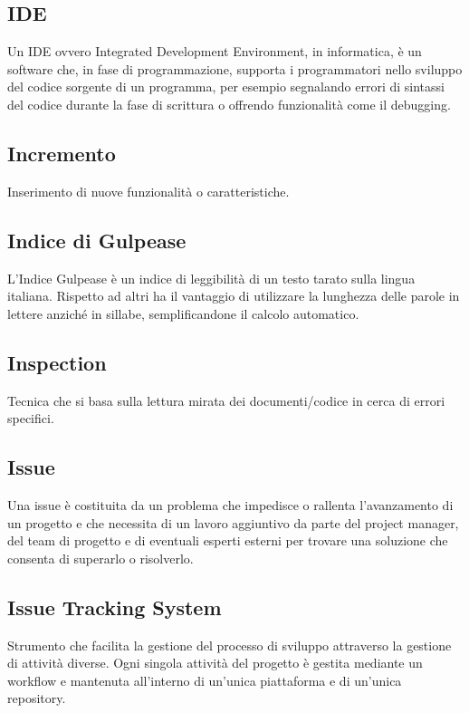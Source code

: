 

\subsection*{IDE}
Un IDE ovvero Integrated Development Environment, in informatica, è un software che, in fase di programmazione, supporta i programmatori nello sviluppo del codice sorgente di un programma, per esempio segnalando errori di sintassi del codice durante la fase di scrittura o offrendo funzionalità come il debugging.

\subsection*{Incremento}
Inserimento di nuove funzionalità o caratteristiche.

\subsection*{Indice di Gulpease}
L'Indice Gulpease è un indice di leggibilità di un testo tarato sulla lingua italiana. Rispetto ad altri ha il vantaggio di utilizzare la lunghezza delle parole in lettere anziché in sillabe, semplificandone il calcolo automatico.

\subsection*{Inspection}
Tecnica che si basa sulla lettura mirata dei documenti/codice in cerca di errori specifici.

\subsection*{Issue}
Una issue è costituita da un problema che impedisce o rallenta l’avanzamento di un progetto e che necessita di un lavoro aggiuntivo da parte del project manager, del team di progetto e di eventuali esperti esterni per trovare una soluzione che consenta di superarlo o risolverlo.

\subsection*{Issue Tracking System}
Strumento che facilita la gestione del processo di sviluppo attraverso la gestione di attività diverse.
Ogni singola attività del progetto è gestita mediante un workflow e mantenuta all’interno di un’unica piattaforma e di un’unica repository.


